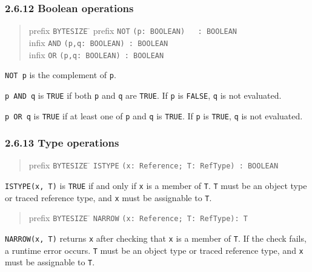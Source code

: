 \documentclass[10pt]{article}
\begin{document}
\subsubsection*{2.6.12 Boolean operations}

\begin{quote}
  \begin{tabbing}
    prefix \= \verb|BYTESIZE| \= \kill
    prefix \> \verb|NOT| \> \verb|(p: BOOLEAN)   : BOOLEAN| \\
     infix \> \verb|AND| \> \verb|(p,q: BOOLEAN) : BOOLEAN| \\
     infix \> \verb|OR|  \> \verb|(p,q: BOOLEAN) : BOOLEAN|
  \end{tabbing}
\end{quote}
\verb|NOT p| is the complement of \verb|p|.

\verb|p AND q| is \verb|TRUE| if both \verb|p| and \verb|q| are \verb|TRUE|.
If \verb|p| is \verb|FALSE|, \verb|q| is not evaluated.

\verb|p OR q| is \verb|TRUE| if at least one of \verb|p| and \verb|q| is
\verb|TRUE|.  If \verb|p| is \verb|TRUE|, \verb|q| is not evaluated.

\subsubsection*{2.6.13 Type operations}

\begin{quote}
  \begin{tabbing}
    prefix \= \verb|BYTESIZE| \= \kill
           \> \verb|ISTYPE| \> \verb|(x: Reference; T: RefType) : BOOLEAN|
  \end{tabbing}
\end{quote}
\verb|ISTYPE(x, T)| is \verb|TRUE| if and only if \verb|x| is a member of
\verb|T|.  \verb|T| must be an object type or traced reference type, and
\verb|x| must be assignable to \verb|T|.
\begin{quote}
  \begin{tabbing}
    prefix \= \verb|BYTESIZE| \= \kill
           \> \verb|NARROW| \> \verb|(x: Reference; T: RefType): T|
  \end{tabbing}
\end{quote}
\verb|NARROW(x, T)| returns \verb|x| after checking that \verb|x| is a member
of \verb|T|.  If the check fails, a runtime error occurs.  \verb|T| must be an
object type or traced reference type, and \verb|x| must be assignable to
\verb|T|.
\end{document}
